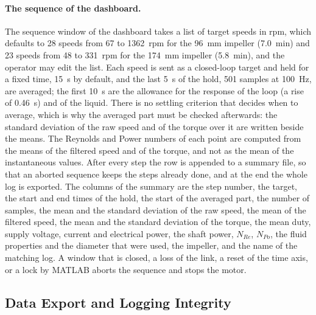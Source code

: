 \paragraph{The sequence of the dashboard.}
The sequence window of the dashboard takes a list of target speeds in rpm, which defaults to 28 speeds from 67 to 1362~rpm for the 96~mm impeller (7.0~min) and 23 speeds from 48 to 331~rpm for the 174~mm impeller (5.8~min), and the operator may edit the list. Each speed is sent as a closed-loop target and held for a fixed time, 15~s by default, and the last 5~s of the hold, 501 samples at 100~Hz, are averaged; the first 10~s are the allowance for the response of the loop (a rise of 0.46~s) and of the liquid. There is no settling criterion that decides when to average, which is why the averaged part must be checked afterwards: the standard deviation of the raw speed and of the torque over it are written beside the means. The Reynolds and Power numbers of each point are computed from the means of the filtered speed and of the torque, and not as the mean of the instantaneous values. After every step the row is appended to a summary file, so that an aborted sequence keeps the steps already done, and at the end the whole log is exported. The columns of the summary are the step number, the target, the start and end times of the hold, the start of the averaged part, the number of samples, the mean and the standard deviation of the raw speed, the mean of the filtered speed, the mean and the standard deviation of the torque, the mean duty, supply voltage, current and electrical power, the shaft power, $N_{Re}$, $N_{Po}$, the fluid properties and the diameter that were used, the impeller, and the name of the matching log. A window that is closed, a loss of the link, a reset of the time axis, or a lock by MATLAB aborts the sequence and stops the motor.

\subsection{Data Export and Logging Integrity}
\label{subsec:agit-logging}

